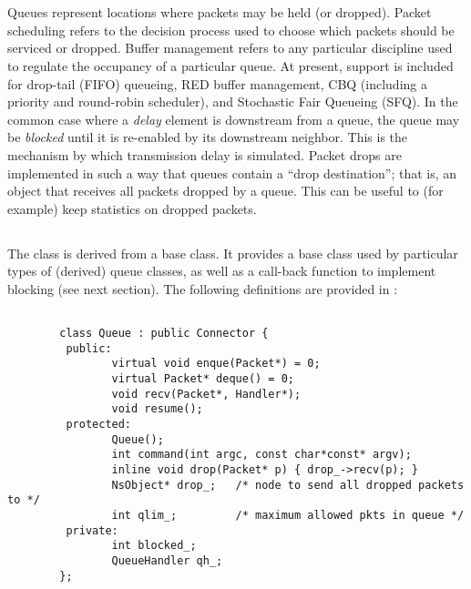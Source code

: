 %
%
\section{}

Queues represent locations where packets may be held (or dropped).
Packet scheduling refers to the decision process used to choose
which packets should be serviced or dropped.
Buffer management refers to any particular discipline used
to regulate the occupancy of a particular queue.
At present, support is included for drop-tail (FIFO) queueing,
RED buffer management, CBQ (including a priority and round-robin scheduler), and
Stochastic Fair Queueing (SFQ).
In the common case where a {\em delay} element is downstream from
a queue, the queue may be {\em blocked} until it is re-enabled
by its downstream neighbor.
This is the mechanism by which transmission delay is simulated.
Packet drops are implemented in such a way that queues contain
a ``drop destination''; that is, an object that receives all packets
dropped by a queue.
This can be useful to (for example) keep statistics on dropped packets.

\subsection{}

The  class is derived from a  base class.
It provides a base class used by particular types of (derived) queue classes,
as well as a call-back function to implement blocking (see next section).
The following definitions are provided in :
\begin{small}
\begin{verbatim}

        class Queue : public Connector {
         public:
                virtual void enque(Packet*) = 0;
                virtual Packet* deque() = 0;
                void recv(Packet*, Handler*);
                void resume();
         protected:
                Queue();
                int command(int argc, const char*const* argv);
                inline void drop(Packet* p) { drop_->recv(p); }
                NsObject* drop_;   /* node to send all dropped packets to */
                int qlim_;         /* maximum allowed pkts in queue */
         private:
                int blocked_;
                QueueHandler qh_;
        };
\end{verbatim}
\end{small}

